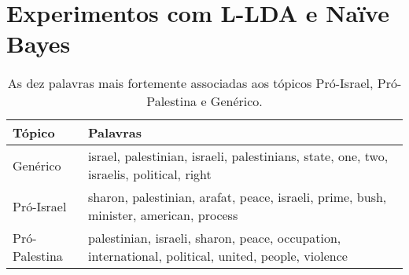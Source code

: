 


\section{Experimentos com L-LDA e Naïve Bayes}
\label{freqs:experim}

\begin{table}[h]
\centering
\begin{tabular}{| l | p{10cm} | }
\hline
Tópico & Palavras \\ \hline
Genérico & israel, palestinian, israeli, palestinians, state, one, two, israelis, political, right \\ \hline
Pró-Israel & sharon, palestinian, arafat, peace, israeli, prime, bush, minister, american, process \\ \hline
Pró-Palestina & palestinian, israeli, sharon, peace, occupation, international, political, united, people, violence \\ \hline
\end{tabular}
\label{1}
\caption{As dez palavras mais fortemente associadas aos tópicos Pró-Israel, Pró-Palestina e Genérico.}
\end{table}


